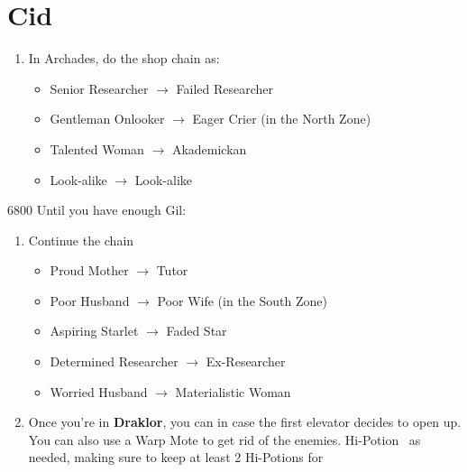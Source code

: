 \chapter{Cid}

\begin{enumerate}
	\item In Archades, do the shop chain as:
	      \begin{itemize}
		      \item Senior Researcher $\rightarrow$ Failed Researcher
		      \item Gentleman Onlooker $\rightarrow$ Eager Crier (in the North Zone)
		      \item Talented Woman $\rightarrow$ Akademickan
		      \item Look-alike $\rightarrow$ Look-alike
	      \end{itemize}
\end{enumerate}
\begin{shop}{6800}
	Until you have enough Gil:
\end{shop}
\begin{enumerate}[resume]
	\item Continue the chain
	      \begin{itemize}
		      \item Proud Mother $\rightarrow$ Tutor
		      \item Poor Husband $\rightarrow$ Poor Wife (in the South Zone)
		      \item Aspiring Starlet $\rightarrow$ Faded Star
		      \item Determined Researcher $\rightarrow$ Ex-Researcher
		      \item Worried Husband $\rightarrow$ Materialistic Woman
	      \end{itemize}
	\item Once you're in \textbf{Draklor}, you can \decoy{\ashe}{\ashe} in case the first elevator decides to open up. You can also use a Warp Mote to get rid of the enemies.
	      \penelof Hi-Potion \vaan\ as needed, making sure to keep at least 2 Hi-Potions for 
\end{enumerate}
\begin{menu}
	\begin{itemize}
		\battlefast
	\end{itemize}
\end{menu}
